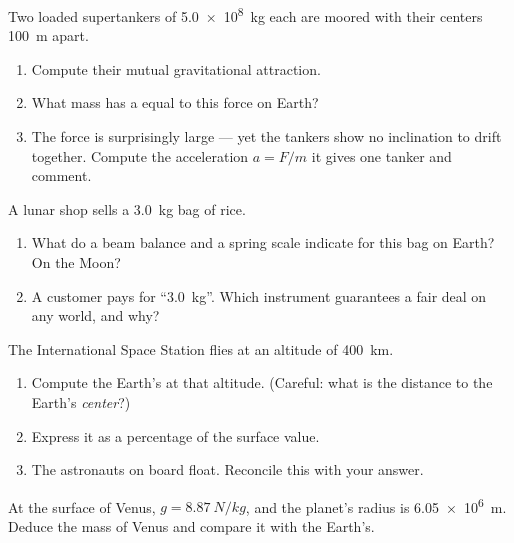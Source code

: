 \begin{exercise}[$\star\star$]\label{exo:g10:universal-gravitation:6}
Two loaded supertankers of \qty{5.0e8}{kg} each are moored with their
centers \qty{100}{m} apart.
\begin{enumerate}
  \item Compute their mutual gravitational attraction.
  \item What mass has a  equal to this force on Earth?
  \item The force is surprisingly large --- yet the tankers show no
        inclination to drift together. Compute the acceleration
        $a = F/m$ it gives one tanker and comment.
\end{enumerate}
\end{exercise}

\begin{exercise}[$\star\star$]\label{exo:g10:universal-gravitation:7}
A lunar shop sells a \qty{3.0}{kg} bag of rice.
\begin{enumerate}
  \item What do a beam balance and a spring scale indicate for this bag
        on Earth? On the Moon?
  \item A customer pays for ``\qty{3.0}{kg}''. Which instrument
        guarantees a fair deal on any world, and why?
\end{enumerate}
\end{exercise}

\begin{exercise}[$\star\star$]\label{exo:g10:universal-gravitation:8}
The International Space Station flies at an altitude of \qty{400}{km}.
\begin{enumerate}
  \item Compute the Earth's  at that
        altitude. (Careful: what is the distance to the Earth's
        \emph{center}?)
  \item Express it as a percentage of the surface value.
  \item The astronauts on board float. Reconcile this with your answer.
\end{enumerate}
\end{exercise}

\begin{exercise}[$\star\star$]\label{exo:g10:universal-gravitation:9}
At the surface of Venus, $g = \qty{8.87}{N/kg}$, and the planet's
radius is \qty{6.05e6}{m}. Deduce the mass of Venus and compare it with
the Earth's.
\end{exercise}


